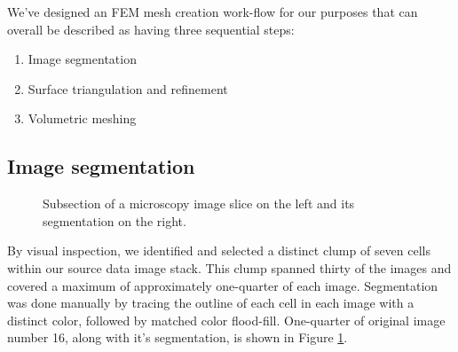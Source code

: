 \documentclass[a4paper,10pt]{article}
\begin{document}
We've designed an FEM mesh creation work-flow for our purposes that can overall be described as having three sequential steps:
\begin{enumerate}
\item Image segmentation
\item Surface triangulation and refinement
\item Volumetric meshing
\end{enumerate}

\subsection{Image segmentation}

\begin{figure}[H]
\begin{center}
\hspace{0.5cm}
\end{center}
\caption{Subsection of a microscopy image slice on the left and its segmentation on the right.}
\label{fig:slice}
\end{figure}

By visual inspection, we identified and selected a distinct clump of seven cells within our source data image stack.  This clump spanned thirty of the images and covered a maximum of approximately one-quarter of each image. Segmentation was done manually by tracing the outline of each cell in each image with a distinct color, followed by matched color flood-fill. One-quarter of original image number 16, along with it's segmentation, is shown in Figure \ref{fig:slice}.\\
\end{document}
